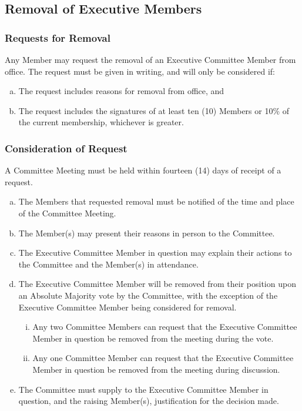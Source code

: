 \documentclass[a4paper,12pt]{article}
\begin{document}
\subsection{Removal of Executive Members}

\subsubsection{Requests for Removal}

Any Member may request the removal of an Executive Committee Member from office. The request must be given in writing, and will only be considered if:

\begin{enumerate}[a)]
	\item The request includes reasons for removal from office, and
	\item The request includes the signatures of at least ten (10) Members or 10\% of the current membership, whichever is greater.
\end{enumerate}

\subsubsection{Consideration of Request}

A Committee Meeting must be held within fourteen (14) days of receipt of a request.

\begin{enumerate}[a)]
	\item The Members that requested removal must be notified of the time and place of the Committee Meeting.
	\item The Member(s) may present their reasons in person to the Committee.
	\item The Executive Committee Member in question may explain their actions to the Committee and the Member(s) in attendance.
	\item The Executive Committee Member will be removed from their position upon an Absolute Majority vote by the Committee, with the exception of the Executive Committee Member being considered for removal.
	\begin{enumerate}[i)]
		\item Any two Committee Members can request that the Executive Committee Member in question be removed from the meeting during the vote.
		\item Any one Committee Member can request that the Executive Committee Member in question be removed from the meeting during discussion.
	\end{enumerate}
	\item The Committee must supply to the Executive Committee Member in question, and the raising Member(s), justification for the decision made.
\end{enumerate}
\end{document}
